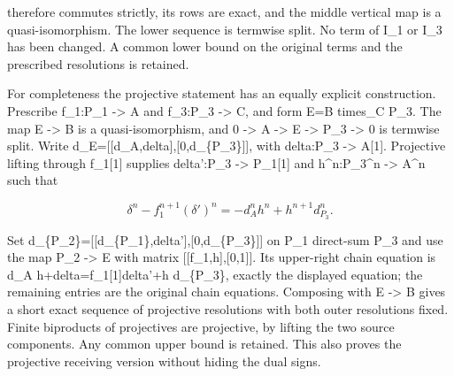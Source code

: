 \documentclass[11pt]{article}
\begin{document}
therefore commutes strictly,\allowbreak{} its rows are exact,\allowbreak{} and the middle vertical map is a quasi-isomorphism. The lower sequence is termwise split. No term of I\_\allowbreak{}1 or I\_\allowbreak{}3 has been changed. A common lower bound on the original terms and the prescribed resolutions is retained.

For completeness the projective statement has an equally explicit construction. Prescribe f\_\allowbreak{}1:\allowbreak{}P\_\allowbreak{}1 \allowbreak{}-> A and f\_\allowbreak{}3:\allowbreak{}P\_\allowbreak{}3 \allowbreak{}-> C,\allowbreak{} and form E\allowbreak{}=B times\_\allowbreak{}C P\_\allowbreak{}3. The map E \allowbreak{}-> B is a quasi-isomorphism,\allowbreak{} and 0 \allowbreak{}-> A \allowbreak{}-> E \allowbreak{}-> P\_\allowbreak{}3 \allowbreak{}-> 0 is termwise split. Write d\_\allowbreak{}E\allowbreak{}=[[d\_\allowbreak{}A,\allowbreak{}delta]\allowbreak{},\allowbreak{}[0,\allowbreak{}d\_\allowbreak{}\{P\_\allowbreak{}3\}]\allowbreak{}]\allowbreak{},\allowbreak{} with delta:\allowbreak{}P\_\allowbreak{}3 \allowbreak{}-> A[1]\allowbreak{}. Projective lifting through f\_\allowbreak{}1[1]\allowbreak{} supplies delta':\allowbreak{}P\_\allowbreak{}3 \allowbreak{}-> P\_\allowbreak{}1[1]\allowbreak{} and h\textasciicircum{}n:\allowbreak{}P\_\allowbreak{}3\textasciicircum{}n \allowbreak{}-> A\^{}n such that

\[
 \delta^n-f_1^{n+1}(\delta')^n
              =-d_A^n h^n+h^{n+1}d_{P_3}^n.
\]

Set d\_\allowbreak{}\{P\_\allowbreak{}2\}\allowbreak{}=[[d\_\allowbreak{}\{P\_\allowbreak{}1\},\allowbreak{}delta']\allowbreak{},\allowbreak{}[0,\allowbreak{}d\_\allowbreak{}\{P\_\allowbreak{}3\}]\allowbreak{}]\allowbreak{} on P\_\allowbreak{}1 direct-sum P\_\allowbreak{}3 and use the map P\_\allowbreak{}2 \allowbreak{}-> E with matrix [[f\_\allowbreak{}1,\allowbreak{}h]\allowbreak{},\allowbreak{}[0,\allowbreak{}1]\allowbreak{}]\allowbreak{}. Its upper-right chain equation is d\_\allowbreak{}A h\allowbreak{}+delta\allowbreak{}=f\_\allowbreak{}1[1]\allowbreak{}delta'\allowbreak{}+h d\_\allowbreak{}\{P\_\allowbreak{}3\},\allowbreak{} exactly the displayed equation; the remaining entries are the original chain equations. Composing with E \allowbreak{}-> B gives a short exact sequence of projective resolutions with both outer resolutions fixed. Finite biproducts of projectives are projective,\allowbreak{} by lifting the two source components. Any common upper bound is retained. This also proves the projective receiving version without hiding the dual signs.
\end{document}
